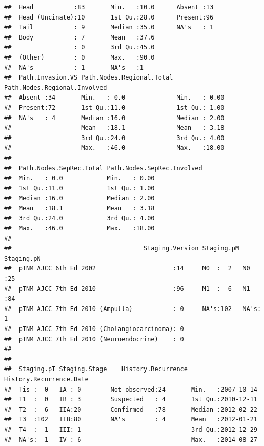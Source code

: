 \documentclass{article}\usepackage[]{graphicx}\usepackage[]{color}
\makeatletter
\newenvironment{kframe}{%
 \def\at@end@of@kframe{}%
 \ifinner\ifhmode%
  \def\at@end@of@kframe{\end{minipage}}%
  \begin{minipage}{\columnwidth}%
 \fi\fi%
 \def\FrameCommand##1{\hskip\@totalleftmargin \hskip-\fboxsep
 \colorbox{shadecolor}{##1}\hskip-\fboxsep
     \hskip-\linewidth \hskip-\@totalleftmargin \hskip\columnwidth}%
 \MakeFramed {\advance\hsize-\width
   \@totalleftmargin\z@ \linewidth\hsize
   \@setminipage}}%
 {\par\unskip\endMakeFramed%
 \at@end@of@kframe}
\newenvironment{knitrout}{}{} %
\makeatother
\begin{document}
\begin{knitrout}
\begin{kframe}
\begin{verbatim}
##  Head           :83       Min.   :10.0      Absent :13      
##  Head (Uncinate):10       1st Qu.:28.0      Present:96      
##  Tail           : 9       Median :35.0      NA's   : 1      
##  Body           : 7       Mean   :37.6                      
##                 : 0       3rd Qu.:45.0                      
##  (Other)        : 0       Max.   :90.0                      
##  NA's           : 1       NA's   :1                         
##  Path.Invasion.VS Path.Nodes.Regional.Total Path.Nodes.Regional.Involved
##  Absent :34       Min.   : 0.0              Min.   : 0.00               
##  Present:72       1st Qu.:11.0              1st Qu.: 1.00               
##  NA's   : 4       Median :16.0              Median : 2.00               
##                   Mean   :18.1              Mean   : 3.18               
##                   3rd Qu.:24.0              3rd Qu.: 4.00               
##                   Max.   :46.0              Max.   :18.00               
##                                                                         
##  Path.Nodes.SepRec.Total Path.Nodes.SepRec.Involved
##  Min.   : 0.0            Min.   : 0.00             
##  1st Qu.:11.0            1st Qu.: 1.00             
##  Median :16.0            Median : 2.00             
##  Mean   :18.1            Mean   : 3.18             
##  3rd Qu.:24.0            3rd Qu.: 4.00             
##  Max.   :46.0            Max.   :18.00             
##                                                    
##                                    Staging.Version Staging.pM Staging.pN
##  pTNM AJCC 6th Ed 2002                     :14     M0  :  2   N0  :25   
##  pTNM AJCC 7th Ed 2010                     :96     M1  :  6   N1  :84   
##  pTNM AJCC 7th Ed 2010 (Ampulla)           : 0     NA's:102   NA's: 1   
##  pTNM AJCC 7th Ed 2010 (Cholangiocarcinoma): 0                          
##  pTNM AJCC 7th Ed 2010 (Neuroendocrine)    : 0                          
##                                                                         
##                                                                         
##  Staging.pT Staging.Stage    History.Recurrence History.Recurrence.Date
##  Tis :  0   IA : 0        Not observed:24       Min.   :2007-10-14     
##  T1  :  0   IB : 3        Suspected   : 4       1st Qu.:2010-12-11     
##  T2  :  6   IIA:20        Confirmed   :78       Median :2012-02-22     
##  T3  :102   IIB:80        NA's        : 4       Mean   :2012-01-21     
##  T4  :  1   III: 1                              3rd Qu.:2012-12-29     
##  NA's:  1   IV : 6                              Max.   :2014-08-27     

\end{verbatim}
\end{kframe}
\end{knitrout}
\end{document}

